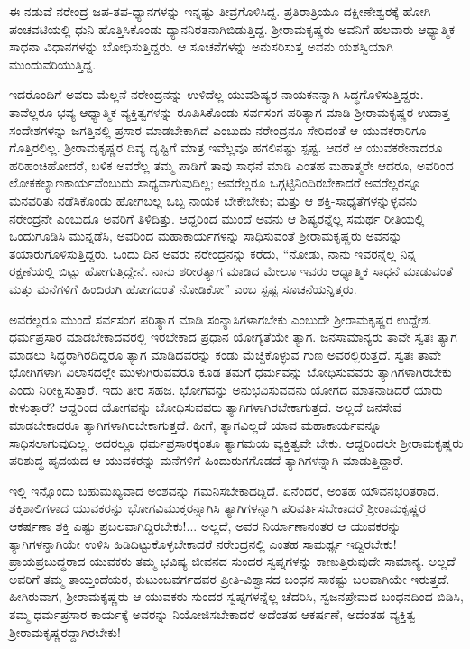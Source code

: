 ಈ ನಡುವೆ ನರೇಂದ್ರ ಜಪ-ತಪ-ಧ್ಯಾನಗಳನ್ನು ಇನ್ನಷ್ಟು ತೀವ್ರಗೊಳಿಸಿದ್ದ. ಪ್ರತಿರಾತ್ರಿಯೂ ದಕ್ಷೀಣೇಶ್ವರಕ್ಕೆ ಹೋಗಿ ಪಂಚವಟಿಯಲ್ಲಿ ಧುನಿ ಹೊತ್ತಿಸಿಕೊಂಡು ಧ್ಯಾನನಿರತನಾಗಿಬಿಡುತ್ತಿದ್ದ. ಶ್ರೀರಾಮಕೃಷ್ಣರು ಅವನಿಗೆ ಹಲವಾರು ಆಧ್ಯಾತ್ಮಿಕ ಸಾಧನಾ ವಿಧಾನಗಳನ್ನು ಬೋಧಿಸುತ್ತಿದ್ದರು. ಆ ಸೂಚನೆಗಳನ್ನು ಅನುಸರಿಸುತ್ತ ಅವನು ಯಶಸ್ವಿಯಾಗಿ ಮುಂದುವರಿಯುತ್ತಿದ್ದ.

ಇದರೊಂದಿಗೆ ಅವರು ಮೆಲ್ಲನೆ ನರೇಂದ್ರನನ್ನು ಉಳಿದೆಲ್ಲ ಯುವಶಿಷ್ಯರ ನಾಯಕನನ್ನಾಗಿ ಸಿದ್ಧಗೊಳಿಸುತ್ತಿದ್ದರು. ತಾವೆಲ್ಲರೂ ಭವ್ಯ ಆಧ್ಯಾತ್ಮಿಕ ವ್ಯಕ್ತಿತ್ವಗಳನ್ನು ರೂಪಿಸಿಕೊಂಡು ಸರ್ವಸಂಗ ಪರಿತ್ಯಾಗ ಮಾಡಿ ಶ್ರೀರಾಮಕೃಷ್ಣರ ಉದಾತ್ತ ಸಂದೇಶಗಳನ್ನು ಜಗತ್ತಿನಲ್ಲಿ ಪ್ರಸಾರ ಮಾಡಬೇಕಾಗಿದೆ ಎಂಬುದು ನರೇಂದ್ರನೂ ಸೇರಿದಂತೆ ಆ ಯುವಕರಾರಿಗೂ ಗೊತ್ತಿರಲಿಲ್ಲ. ಶ್ರೀರಾಮಕೃಷ್ಣರ ದಿವ್ಯ ದೃಷ್ಟಿಗೆ ಮಾತ್ರ ಇವೆಲ್ಲವೂ ಹಗಲಿನಷ್ಟು ಸ್ಪಷ್ಟ. ಆದರೆ ಆ ಯುವಕರೇನಾದರೂ ಹರಿಹಂಚಿಹೋದರೆ, ಬಳಿಕ ಅವರೆಲ್ಲ ತಮ್ಮ ಪಾಡಿಗೆ ತಾವು ಸಾಧನೆ ಮಾಡಿ ಎಂತಹ ಮಹಾತ್ಮರೇ ಆದರೂ, ಅವರಿಂದ ಲೋಕಕಲ್ಯಾಣಕಾರ್ಯವೆಂಬುದು ಸಾಧ್ಯವಾಗುವುದಿಲ್ಲ; ಅವರೆಲ್ಲರೂ ಒಗ್ಗಟ್ಟಿನಿಂದಿರಬೇಕಾದರೆ ಅವರೆಲ್ಲರನ್ನೂ ಮನವರಿತು ನಡೆಸಿಕೊಂಡು ಹೋಗಬಲ್ಲ ಒಬ್ಬ ನಾಯಕ ಬೇಕೇಬೇಕು; ಮತ್ತು ಆ ಶಕ್ತಿ-ಸಾಧ್ಯತೆಗಳನ್ನುಳ್ಳವನು ನರೇಂದ್ರನೇ ಎಂಬುದೂ ಅವರಿಗೆ ತಿಳಿದಿತ್ತು. ಆದ್ದರಿಂದ ಮುಂದೆ ಅವನು ಆ ಶಿಷ್ಯರನ್ನೆಲ್ಲ ಸಮರ್ಥ ರೀತಿಯಲ್ಲಿ ಒಂದುಗೂಡಿಸಿ ಮುನ್ನಡೆಸಿ, ಅವರಿಂದ ಮಹಾಕಾರ್ಯಗಳನ್ನು ಸಾಧಿಸುವಂತೆ ಶ್ರೀರಾಮಕೃಷ್ಣರು ಅವನನ್ನು ತಯಾರುಗೊಳಿಸುತ್ತಿದ್ದರು. ಒಂದು ದಿನ ಅವರು ನರೇಂದ್ರನನ್ನು ಕರೆದು, “ನೋಡು, ನಾನು ಇವರನ್ನೆಲ್ಲ ನಿನ್ನ ರಕ್ಷಣೆಯಲ್ಲಿ ಬಿಟ್ಟು ಹೋಗುತ್ತಿದ್ದೇನೆ. ನಾನು ಶರೀರತ್ಯಾಗ ಮಾಡಿದ ಮೇಲೂ ಇವರು ಆಧ್ಯಾತ್ಮಿಕ ಸಾಧನೆ ಮಾಡುವಂತೆ ಮತ್ತು ಮನೆಗಳಿಗೆ ಹಿಂದಿರುಗಿ ಹೋಗದಂತೆ ನೋಡಿಕೋ” ಎಂಬ ಸ್ಪಷ್ಟ ಸೂಚನೆಯನ್ನಿತ್ತರು.

ಅವರೆಲ್ಲರೂ ಮುಂದೆ ಸರ್ವಸಂಗ ಪರಿತ್ಯಾಗ ಮಾಡಿ ಸಂನ್ಯಾಸಿಗಳಾಗಬೇಕು ಎಂಬುದೇ ಶ್ರೀರಾಮಕೃಷ್ಣರ ಉದ್ದೇಶ. ಧರ್ಮಪ್ರಸಾರ ಮಾಡಬೇಕಾದವರಲ್ಲಿ ಇರಬೇಕಾದ ಪ್ರಧಾನ ಯೋಗ್ಯತೆಯೇ ತ್ಯಾಗ. ಜನಸಾಮಾನ್ಯರು ತಾವೇ ಸ್ವತಃ ತ್ಯಾಗ ಮಾಡಲು ಸಿದ್ಧರಾಗಿರದಿದ್ದರೂ ತ್ಯಾಗ ಮಾಡಿದವರನ್ನು ಕಂಡು ಮೆಚ್ಚಿಕೊಳ್ಳುವ ಗುಣ ಅವರಲ್ಲಿರುತ್ತದೆ. ಸ್ವತಃ ತಾವೇ ಭೋಗಿಗಳಾಗಿ ವಿಲಾಸದಲ್ಲೇ ಮುಳುಗಿರುವವರೂ ಕೂಡ ತಮಗೆ ಧರ್ಮವನ್ನು ಬೋಧಿಸುವವರು ತ್ಯಾಗಿಗಳಾಗಿರಬೇಕು ಎಂದು ನಿರೀಕ್ಷಿಸುತ್ತಾರೆ. ಇದು ತೀರ ಸಹಜ. ಭೋಗವನ್ನು ಅನುಭವಿಸುವವನು ಯೋಗದ ಮಾತನಾಡಿದರೆ ಯಾರು ಕೇಳುತ್ತಾರೆ? ಆದ್ದರಿಂದ ಯೋಗವನ್ನು ಬೋಧಿಸುವವರು ತ್ಯಾಗಿಗಳಾಗಿರಬೇಕಾಗುತ್ತದೆ. ಅಲ್ಲದೆ ಜನಸೇವೆ ಮಾಡಬೇಕಾದರೂ ತ್ಯಾಗಿಗಳಾಗಿರಬೇಕಾಗುತ್ತದೆ. ಹೀಗೆ, ತ್ಯಾಗವಿಲ್ಲದೆ ಯಾವ ಮಹಾಕಾರ್ಯವನ್ನೂ ಸಾಧಿಸಲಾಗುವುದಿಲ್ಲ. ಅದರಲ್ಲೂ ಧರ್ಮಪ್ರಸಾರಕ್ಕಂತೂ ತ್ಯಾಗಮಯ ವ್ಯಕ್ತಿತ್ವವೇ ಬೇಕು. ಆದ್ದರಿಂದಲೇ ಶ್ರೀರಾಮಕೃಷ್ಣರು ಪರಿಶುದ್ಧ ಹೃದಯದ ಆ ಯುವಕರನ್ನು ಮನೆಗಳಿಗೆ ಹಿಂದುರುಗಗೊಡದೆ ತ್ಯಾಗಿಗಳನ್ನಾಗಿ ಮಾಡುತ್ತಿದ್ದಾರೆ. 

ಇಲ್ಲಿ ಇನ್ನೊಂದು ಬಹುಮಖ್ಯವಾದ ಅಂಶವನ್ನು ಗಮನಿಸಬೇಕಾದದ್ದಿದೆ. ಏನೆಂದರೆ, ಅಂತಹ ಯೌವನಭರಿತರಾದ, ಶಕ್ತಿಶಾಲಿಗಳಾದ ಯುವಕರನ್ನು ಭೋಗವಿಮುಕ್ತರನ್ನಾಗಿಸಿ ತ್ಯಾಗಿಗಳನ್ನಾಗಿ ಪರಿವರ್ತಿಸಬೇಕಾದರೆ ಶ್ರೀರಾಮಕೃಷ್ಣರ ಆಕರ್ಷಣಾ ಶಕ್ತಿ ಎಷ್ಟು ಪ್ರಬಲವಾಗಿದ್ದಿರಬೇಕು!... ಅಲ್ಲದೆ, ಅವರ ನಿರ್ಯಾಣಾನಂತರ ಆ ಯುವಕರನ್ನು ತ್ಯಾಗಿಗಳನ್ನಾಗಿಯೇ ಉಳಿಸಿ ಹಿಡಿದಿಟ್ಟುಕೊಳ್ಳಬೇಕಾದರೆ ನರೇಂದ್ರನಲ್ಲಿ ಎಂತಹ ಸಾಮರ್ಥ್ಯ ಇದ್ದಿರಬೇಕು! ಪ್ರಾಯಪ್ರಬುದ್ಧರಾದ ಯುವಕರು ತಮ್ಮ ಭವಿಷ್ಯ ಜೀವನದ ಸುಂದರ ಸ್ವಪ್ನಗಳನ್ನು ಕಾಣುತ್ತಿರುವುದೇ ಸಾಮಾನ್ಯ. ಅಲ್ಲದೆ ಅವರಿಗೆ ತಮ್ಮ ತಾಯ್ತಂದೆಯರ, ಕುಟುಂಬವರ್ಗದವರ ಪ್ರೀತಿ-ವಿಶ್ವಾಸದ ಬಂಧನ ಸಾಕಷ್ಟು ಬಲವಾಗಿಯೇ ಇರುತ್ತದೆ. ಹೀಗಿರುವಾಗ, ಶ್ರೀರಾಮಕೃಷ್ಣರು ಆ ಯುವಕರು ಸುಂದರ ಸ್ವಪ್ನಗಳನ್ನೆಲ್ಲ ಚೆದರಿಸಿ, ಸ್ವಜನಪ್ರೇಮದ ಬಂಧನದಿಂದ ಬಿಡಿಸಿ, ತಮ್ಮ ಧರ್ಮಪ್ರಸಾರ ಕಾರ್ಯಕ್ಕೆ ಅವರನ್ನು ನಿಯೋಜಿಸಬೇಕಾದರೆ ಅದೆಂತಹ ಆಕರ್ಷಣೆ, ಅದೆಂತಹ ವ್ಯಕ್ತಿತ್ವ ಶ್ರೀರಾಮಕೃಷ್ಣರದ್ದಾಗಿರಬೇಕು!

